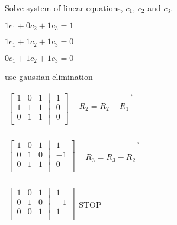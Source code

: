 \documentclass{extarticle}
\begin{document}
Solve system of linear equations, $c_1$, $c_2$ and $c_3$.

$1c_1+0c_2+1c_3=1$

$1c_1+1c_2+1c_3=0$

$0c_1+1c_2+1c_3=0$

use gaussian elimination


$\begin{matrix}\left[\begin{matrix}1&0&1\\1&1&1\\0&1&1\\\end{matrix}\middle|\begin{matrix}1\\0\\0\\\end{matrix}\right]&\vec{\begin{matrix}\\R_2=R_2-R_1\\ \\\end{matrix}}\\\end{matrix}$

$\begin{matrix}\left[\begin{matrix}1&0&1\\0&1&0\\0&1&1\\\end{matrix}\middle|\begin{matrix}1\\-1\\0\\\end{matrix}\right]&\vec{\begin{matrix}\\ \\R_3=R_3-R_2\\\end{matrix}}\\\end{matrix}$

$\begin{matrix}\left[\begin{matrix}1&0&1\\0&1&0\\0&0&1\\\end{matrix}\middle|\begin{matrix}1\\-1\\1\\\end{matrix}\right]\\\end{matrix}$STOP
\end{document}
